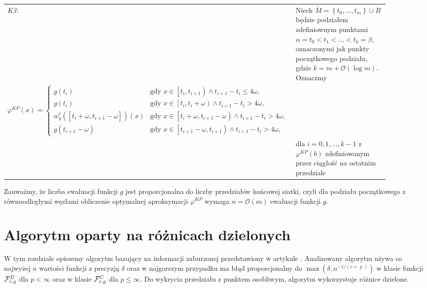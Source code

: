 \documentclass[oik, pdftex, robocza, man]{mgrwms}
\begin{document}
    \begin{table}[H]
        \begin{tabular}{p{0.045\linewidth} p{0.85\linewidth}}
        \textit{K3:}    & Niech $\bar{M} = \left\{ t_{0}, \dots, t_{m} \right\} \cup B$ będzie podziałem zdefiniownym punktami $\alpha = t_{0} < t_{1} < \ldots < t_{k} = \beta$, oznaczonymi jak punkty początkowego podziału, gdzie $k = m + \mathcal{O}(\log m)$. Oznaczmy  \\ \vspace{-15pt}
                        $$\varphi^{KP}(x)= \begin{cases}
                            g\left(t_{i}\right)                                                 &\text{gdy } x \in \left[t_{i}, t_{i+1}\right) \land t_{i+1}-t_{i} \leq 4 \omega, \\ 
                            g\left(t_{i}\right)                                                 &\text{gdy } x \in \left[t_{i}, t_{i}+\omega\right) \land t_{i+1}-t_{i}>4 \omega, \\ 
                            w_{g}^{r}\left(\left[t_{i}+\omega, t_{i+1}-\omega\right]\right)(x)  &\text{gdy } x \in\left[t_{i}+\omega, t_{i+1}-\omega\right) \land t_{i+1}-t_{i}>4 \omega, \\ 
                            g\left(t_{i+1}-\omega\right)                                        &\text{gdy } x \in\left[t_{i+1}-\omega, t_{i+1}\right) \land t_{i+1}-t_{i}>4 \omega,
                            \end{cases}$$ \vspace{-10pt} \\
                        & dla $i=0,1,\dots,k-1$ z $\varphi^{KP}(b) $ zdefiniowanym przez ciągłość na ostatnim przedziale \\
        \end{tabular}
    \end{table}


    Zauważmy, że liczba ewaluacji funkcji $g$ jest proporcjonalna do liczby przedziałów końcowej siatki, czyli dla podziału początkowego z równoodległymi węzłami obliczenie optymalnej aproksymacji $\varphi^{KP}$ wymaga $n = \mathcal{O}(m)$ ewaluacji funkcji $g$.

\section{Algorytm oparty na różnicach dzielonych}


    W tym rozdziale opiszemy algorytm bazujący na informacji zaburzonej przedstawiony w artykule \cite{AoP}. Analizowany algorytm używa co najwyżej $n$ wartości funkcji z precyzją $\delta $ oraz w najgorszym przypadku ma błąd proporcjonalny do $\max{(\delta, n^{-1 / (r + \varrho) })}$ w klasie funkcji $\mathcal{F}^D_{r,\varrho }$ dla $p < \infty$ oraz w klasie $\mathcal{F}^C_{r,\varrho }$ dla $p \leq \infty$. Do wykrycia przedziału z punktem osobliwym, algorytm wykorzystuje różnice dzielone.
    
\end{document}
